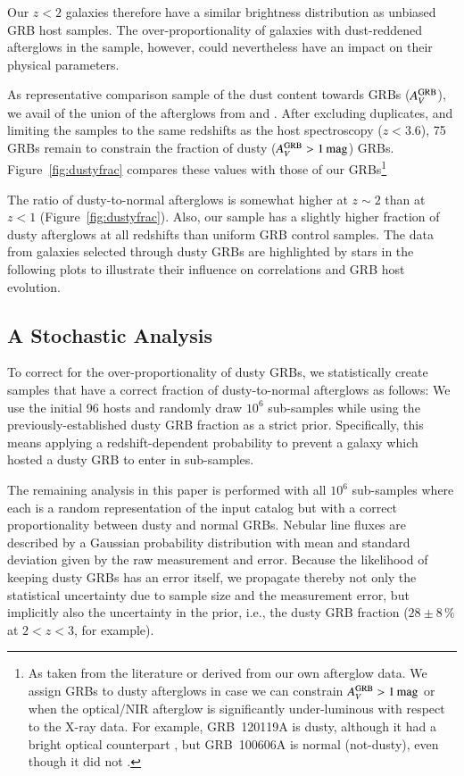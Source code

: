 \documentclass[traditabstract, longauth]{aa}
\begin{document}
{Our $z<2$ galaxies therefore have a similar brightness distribution as unbiased GRB host samples. The over-proportionality of galaxies with dust-reddened afterglows in the sample, however, could nevertheless have an impact on their physical parameters.}

 {As representative comparison sample of the dust content towards GRBs ($A^{\rm{GRB}}_V$), we avail of the union of the afterglows from \citet{2011A&A...526A..30G} and \citet{2013MNRAS.432.1231C}. After excluding duplicates, and limiting the samples to the same redshifts as the host spectroscopy ($z<3.6$), 75 GRBs remain to constrain the fraction of dusty ($A^{\rm{GRB}}_V>1\,\rm{mag}$) GRBs.} {Figure~\ref{fig:dustyfrac} compares these values with those of our GRBs\footnote{As taken from the literature \citep{2009ApJ...693.1484C, 2011A&A...534A.108K, 2015arXiv150402482P} or derived from our own afterglow data. We assign GRBs to dusty afterglows in case we can constrain $A^{\rm{GRB}}_V>1\,\rm{mag}$ or when the optical/NIR afterglow is significantly under-luminous with respect to the X-ray data. For example, GRB~120119A is dusty, although it had a bright optical counterpart \citep{2014MNRAS.440.1810M}, but GRB~100606A is normal (not-dusty), even though it did not \citep{2010GCN..10835...1N}.}} 

 {The ratio of dusty-to-normal afterglows is somewhat higher at $z\sim2$ than at $z<1$ (Figure~\ref{fig:dustyfrac}). Also, our sample has a slightly higher fraction of dusty afterglows at all redshifts than uniform GRB control samples. The data from galaxies selected through dusty GRBs are highlighted by stars in the following plots to illustrate their influence on correlations and GRB host evolution.}

\subsection{A Stochastic Analysis}
\label{sec:statana}

 {To correct for the over-proportionality of dusty GRBs, we statistically create samples that have a correct fraction of dusty-to-normal afterglows as follows: We use the initial 96 hosts and randomly draw $10^6$ sub-samples while using the previously-established dusty GRB fraction as a strict prior. Specifically, this means applying a redshift-dependent probability to prevent a galaxy which hosted a dusty GRB to enter in sub-samples.}
 
 {The remaining analysis in this paper is performed with all $10^{6}$ sub-samples where each is a random representation of the input catalog but with a correct proportionality between dusty and normal GRBs. Nebular line fluxes are described by a Gaussian probability distribution with mean and standard deviation given by the raw measurement and error. Because the likelihood of keeping dusty GRBs has an error itself, we propagate thereby not only the statistical uncertainty due to sample size and the measurement error, but implicitly also the uncertainty in the prior, i.e., the dusty GRB fraction ($28\pm8\,\%$ at $2<z<3$, for example).}
\end{document}
